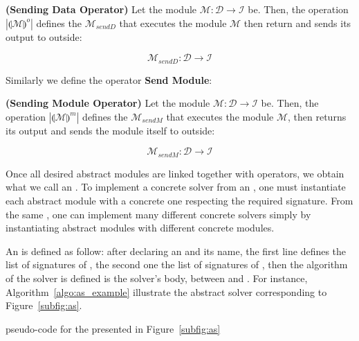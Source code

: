 \begin{definition}\label{op:osend}
{\bf (Sending Data Operator)} Let the module $\mathcal{M} : \mathcal{D} \rightarrow \mathcal{I}$ be. Then, the operation $\left|\llparenthesis \mathcal{M}\rrparenthesis^{o}\right|$ defines the \cm{} $\mathcal{M}_{sendD}$ that executes the module $\mathcal{M}$ then return and sends its output to outside:

\[
\mathcal{M}_{sendD}:\mathcal{D} \rightarrow \mathcal{I}
\]
\end{definition}

Similarly we define the operator \textbf{Send Module}:

\begin{definition}\label{op:msend}
{\bf (Sending Module Operator)} Let the module $\mathcal{M} : \mathcal{D} \rightarrow \mathcal{I}$ be. Then, the operation $\left|\llparenthesis \mathcal{M}\rrparenthesis^{m}\right|$ defines the \cm{} $\mathcal{M}_{sendM}$ that executes the module $\mathcal{M}$, then returns its output and sends the module itself to outside:

\[
\mathcal{M}_{sendM}:\mathcal{D} \rightarrow \mathcal{I}
\]
\end{definition}


Once all desired abstract modules are linked together with operators, we obtain what we call an \as. To implement a concrete solver from an \as, one must instantiate each abstract module with a concrete one respecting the required signature. From the same \as, one can implement many different concrete solvers simply by instantiating abstract modules with different concrete modules.

An \as{} is defined as follow: after declaring an \mbox{} and its name, the first line defines the list of signatures of \oms, the second one the list of signatures of \opchs, then the algorithm of the solver is defined is the solver's body, between \mbox{} and \mbox{}. For instance, Algorithm~\ref{algo:as_example} illustrate the abstract solver corresponding to Figure~\ref{subfig:as}.


\begin{algorithm}[H]
\dontprintsemicolon
\SetNoline
{}
\caption{\posl{} pseudo-code for the \as{} presented in Figure~\ref{subfig:as}}\label{algo:as_example}
\end{algorithm}	